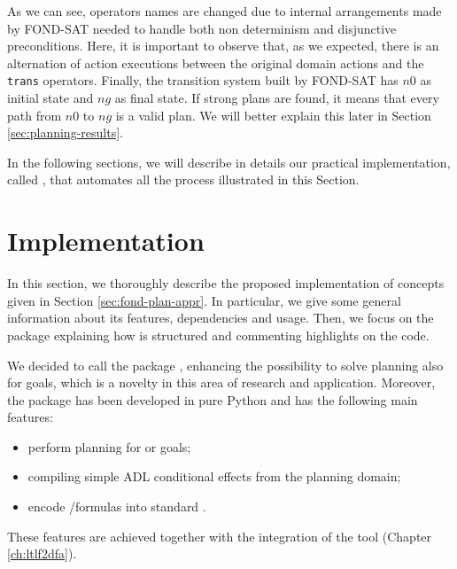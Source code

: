\begin{example}
\begin{lstlisting}[numberstyle=\tiny\color{codegray}\noncopynumber,numbers=left,stepnumber=1, escapechar=£]
\end{lstlisting}
As we can see, operators names are changed due to internal arrangements made by FOND-SAT needed to handle both non determinism and disjunctive preconditions. Here, it is important to observe that, as we expected, there is an alternation of action executions between the original domain actions and the \texttt{trans} operators. Finally, the transition system built by FOND-SAT has $n0$ as initial state and $ng$ as final state. If strong plans are found, it means that every path from $n0$ to $ng$ is a valid plan. We will better explain this later in Section \ref{sec:planning-results}.
\end{example}

In the following sections, we will describe in details our practical implementation, called \FONDFOR, that automates all the process illustrated in this Section.

\section{Implementation}\label{sec:planning-implementation}
In this section, we thoroughly describe the proposed implementation of concepts given in Section \ref{sec:fond-plan-appr}. In particular, we give some general information about its features, dependencies and usage. Then, we focus on the package explaining how is structured and commenting highlights on the code. 

We decided to call the package \FONDFOR, enhancing the possibility to solve \FOND planning also for \PLTL goals, which is a novelty in this area of research and application. Moreover, the package has been developed in pure Python and has the following main features:
\begin{itemize}
\item perform \FOND planning for \LTLf or \PLTL goals;
\item compiling simple ADL conditional effects from the planning domain;
\item encode \LTLf/\PLTL formulas into standard \PDDL \citep{mcdermott1998pddl}.
\end{itemize}
These features are achieved together with the integration of the \LTLfToDFA tool (Chapter \ref{ch:ltlf2dfa}).

